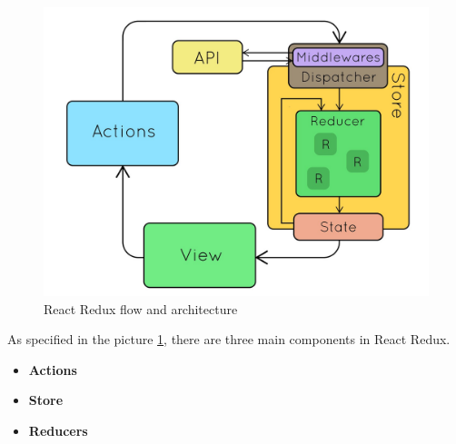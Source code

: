 \begin{figure}[!h]
    \centering
    \includegraphics[scale=0.2]{Picture/mobile/React-redux.jpeg}
    \caption{React Redux flow and architecture}
\label{fig:React-redux}
\end{figure}

As specified in the picture \ref{fig:React-redux}, there are three main components in React Redux. 
\begin{itemize}
    \item \textbf{Actions}
    \item \textbf{Store}
    \item \textbf{Reducers}
\end{itemize}




